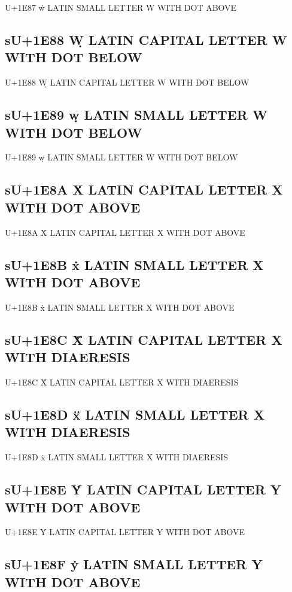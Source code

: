 U+1E87 ẇ LATIN SMALL LETTER W WITH DOT ABOVE

\subsection{sU+1E88 Ẉ LATIN CAPITAL LETTER W WITH DOT BELOW}

U+1E88 Ẉ LATIN CAPITAL LETTER W WITH DOT BELOW

\subsection{sU+1E89 ẉ LATIN SMALL LETTER W WITH DOT BELOW}

U+1E89 ẉ LATIN SMALL LETTER W WITH DOT BELOW

\subsection{sU+1E8A Ẋ LATIN CAPITAL LETTER X WITH DOT ABOVE}

U+1E8A Ẋ LATIN CAPITAL LETTER X WITH DOT ABOVE

\subsection{sU+1E8B ẋ LATIN SMALL LETTER X WITH DOT ABOVE}

U+1E8B ẋ LATIN SMALL LETTER X WITH DOT ABOVE

\subsection{sU+1E8C Ẍ LATIN CAPITAL LETTER X WITH DIAERESIS}

U+1E8C Ẍ LATIN CAPITAL LETTER X WITH DIAERESIS

\subsection{sU+1E8D ẍ LATIN SMALL LETTER X WITH DIAERESIS}

U+1E8D ẍ LATIN SMALL LETTER X WITH DIAERESIS

\subsection{sU+1E8E Ẏ LATIN CAPITAL LETTER Y WITH DOT ABOVE}

U+1E8E Ẏ LATIN CAPITAL LETTER Y WITH DOT ABOVE

\subsection{sU+1E8F ẏ LATIN SMALL LETTER Y WITH DOT ABOVE}

